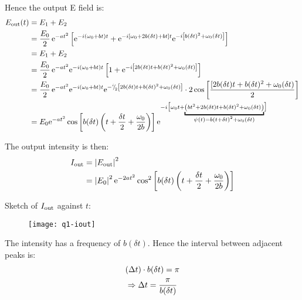 \begin{parts}
	Hence the output E field is:
	\begin{align*}
		E_\textnormal{out}(t) &= E_1 + E_2 \\
		&= \frac{E_0}{2} \, \mathrm{e}^{-at^2} \sbracket{\mathrm{e}^{-i(\omega_0 + bt)t} + \mathrm{e}^{-i\sbracket{\omega_0 + 2b(\delta t) + bt}t} \mathrm{e}^{-i\sbracket{b(\delta t)^2 + \omega_0 (\delta t)}}} \\
		&= E_1 + E_2 \\
		&= \frac{E_0}{2} \, \mathrm{e}^{-at^2} \mathrm{e}^{-i(\omega_0 + bt)t} \sbracket{1 + \mathrm{e}^{-i\sbracket{2b(\delta t)t + b(\delta t)^2 + \omega_0 (\delta t)}}} \\
		&= \frac{E_0}{2} \, \mathrm{e}^{-at^2} \mathrm{e}^{-i(\omega_0 + bt)t} \mathrm{e}^{-\diagfrac{i}{2} \sbracket{2b(\delta t)t + b(\delta t)^2 + \omega_0 (\delta t)}} \cdot 2\cos\sbracket{\frac{[2b(\delta t)t + b(\delta t)^2 + \omega_0 (\delta t)}{2}} \\
		&= E_0 \mathrm{e}^{-at^2} \cos\sbracket{b (\delta t) \rbracket{t + \frac{\delta t}{2} + \frac{\omega_0}{2b}}} \mathrm{e}^{-i\bigl[\omega_0 t + \underbracket{\scriptstyle \rbracket{bt^2 + 2b(\delta t)t + b(\delta t)^2 + \omega_0(\delta t)}}_{\scriptstyle \psi(t) = b(t+\delta t)^2 + \omega_0 (\delta t)}\bigr]}
	\end{align*}
	
	The output intensity is then:
	\begin{align*}
		I_\textnormal{out} &= \left|E_\textnormal{out}\right|^2 \\
		&= \left|E_0\right|^2 \mathrm{e}^{-2at^2} \cos^2\left[b (\delta t) \left(t + \frac{\delta t}{2} + \frac{\omega_0}{2b}\right)\right]
	\end{align*}
	
	Sketch of $I_\textnormal{out}$ against $t$:
	\begin{figure}[H]
		\centering
		\texttt{[image: q1-iout]}
	\end{figure}
	
	The intensity has a frequency of $b(\delta t)$.
	Hence the interval between adjacent peaks is:
	\begin{gather*}
		\left(\Delta t\right) \cdot b(\delta t) = \pi \\
		\Rightarrow \Delta t = \frac{\pi}{b(\delta t)}
	\end{gather*}
	

\end{parts}
